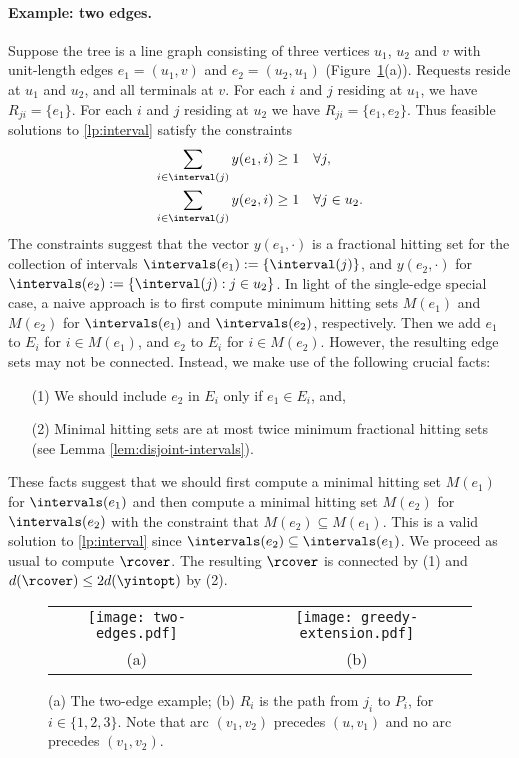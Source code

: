 \paragraph{Example: two edges.}
Suppose the tree is a line graph consisting of three vertices $u_1$,
$u_2$ and $v$ with unit-length edges $e_1 = (u_1, v)$ and $e_2 = (u_2,
u_1)$ (Figure~\ref{fig:examples}(a)). Requests reside at $u_1$ and $u_2$, and all terminals at
$v$. For each $i$ and $j$ residing at $u_1$, we have $R_{ji} =
\{e_1\}$. For each $i$ and $j$ residing at $u_2$ we have $R_{ji} =
\{e_1, e_2\}$. Thus feasible solutions to
\eqref{lp:interval} satisfy the constraints
\begin{align*}
  \sum_{i \in \interval(j)} y(e_1, i) \geq 1 &\quad  \forall j,\\
  \sum_{i \in \interval(j)} y(e_2, i) \geq 1 &\quad \forall j \in u_2.
\end{align*}
The constraints suggest that the vector $y(e_1, \cdot)$ is a
fractional hitting set for the collection of intervals
$\intervals(e_1) := \{\interval(j)\}$, and $y(e_2, \cdot)$ for
$\intervals(e_2) := \{\interval(j) : j \in u_2\}$.
In light of the single-edge special case, a naive approach is to first
compute minimum hitting sets $M(e_1)$ and $M(e_2)$ for
$\intervals(e_1)$ and $\intervals(e_2)$, respectively. Then we add
$e_1$ to $E_i$ for $i \in M(e_1)$, and $e_2$ to $E_i$ for $i \in
M(e_2)$. However, the resulting edge sets may not be connected.
Instead, we make use of the following crucial facts:
\begin{enumerate}
\item[(1)] We should include $e_2$ in $E_i$ only if $e_1 \in E_i$, and,
\item[(2)] Minimal hitting sets are at most twice minimum fractional
  hitting sets (see Lemma \ref{lem:disjoint-intervals}).
\end{enumerate}
These facts suggest that we should first compute a minimal hitting set
$M(e_1)$ for $\intervals(e_1)$ and then compute a minimal hitting set
$M(e_2)$ for $\intervals(e_2)$ with the constraint that $M(e_2)
\subseteq M(e_1)$. This is a valid solution to \eqref{lp:interval}
since $\intervals(e_2) \subseteq \intervals(e_1)$. We proceed as usual
to compute $\rcover$. The resulting $\rcover$ is connected by (1) and
$d(\rcover) \leq 2d(\yintopt)$ by (2).

\begin{figure}
\begin{center}
\begin{tabular}{ccc}
\texttt{[image: two-edges.pdf]}
& \hspace{1 in}  & 
\texttt{[image: greedy-extension.pdf]}\\
(a) & \hspace{1 in}  &   (b)\\
\end{tabular}
\end{center}
\caption{(a) The two-edge example; (b) $R_i$ is the path from $j_i$ to $P_i$, for $i \in \{1,2,3 \}$. Note that arc $(v_1, v_2)$ precedes $(u,v_1)$ and no arc precedes $(v_1,v_2)$.}   
\label{fig:examples}
\end{figure}

